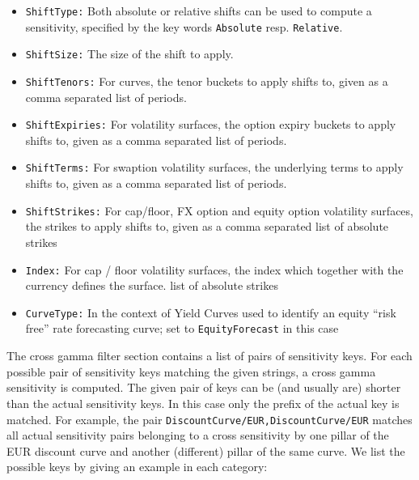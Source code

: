 \documentclass[12pt, a4paper]{article}
\begin{document}
{{\begin{itemize}
\item {\tt ShiftType:} Both absolute or relative shifts can be used to compute a sensitivity, specified by the key words
  {\tt Absolute} resp. {\tt Relative}.
\item {\tt ShiftSize:} The size of the shift to apply.
\item {\tt ShiftTenors:} For curves, the tenor buckets to apply shifts to, given as a comma separated list of periods.
\item {\tt ShiftExpiries:} For volatility surfaces, the option expiry buckets to apply shifts to, given as a comma
  separated list of periods.
\item {\tt ShiftTerms:} For swaption volatility surfaces, the underlying terms to apply shifts to, given as a comma
  separated list of periods.
\item {\tt ShiftStrikes:} For cap/floor, FX option and equity option volatility surfaces, the strikes to apply shifts to, given as a comma separated
  list of absolute strikes
\item {\tt Index:} For cap / floor volatility surfaces, the index which together with the currency defines the surface.
  list of absolute strikes
\item {\tt CurveType:} In the context of Yield Curves used to identify an equity ``risk free'' rate forecasting curve; set to {\tt EquityForecast} in this case
\end{itemize}

The cross gamma filter section contains a list of pairs of sensitivity keys. For each possible pair of sensitivity keys
matching the given strings, a cross gamma sensitivity is computed. The given pair of keys can be (and usually are)
shorter than the actual sensitivity keys. In this case only the prefix of the actual key is matched. For example, the
pair {\tt DiscountCurve/EUR,DiscountCurve/EUR} matches all actual sensitivity pairs belonging to a cross sensitivity by
one pillar of the EUR discount curve and another (different) pillar of the same curve. We list the possible keys by
giving an example in each category:

}}
\end{document}
